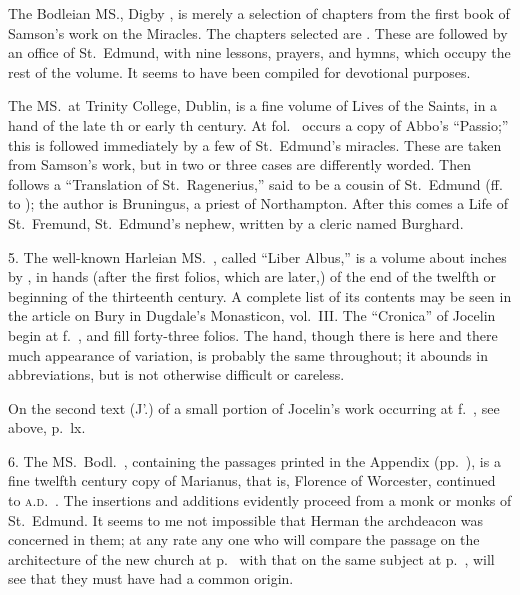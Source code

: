 \documentclass[10pt]{book}
\begin{document}
{The Bodleian MS., Digby , is merely a selection of chapters from the first book of Samson's work on the Miracles. The chapters selected are . These are followed by an office of St.\ Edmund, with nine lessons, prayers, and hymns, which occupy the rest of the volume. It seems to have been compiled for devotional purposes.

The MS.\ at Trinity College, Dublin, is a fine volume of Lives of the Saints, in a hand of the late th or early th century. At fol.\  occurs a copy of Abbo's ``Passio;'' this is followed immediately by a few of St.\ Edmund's miracles. These are taken from Samson's work, but in two or three cases are differently worded. Then follows a ``Translation of St.\ Ragenerius,'' said to be a cousin of St.\ Edmund (ff.\  to ); the author is Bruningus, a priest of Northampton. After this comes a Life of St.\ Fremund, St.\ Edmund's nephew, written by a cleric named Burghard.

5. The well-known Harleian MS.\ , called ``Liber Albus,'' is a volume about  inches by , in hands (after the first  folios, which are later,) of the end of the twelfth or beginning of the thirteenth century. A complete list of its contents may be seen in the article on Bury in Dugdale's Monasticon, vol.\ III. The ``Cronica'' of Jocelin begin at f.\ , and fill forty-three folios. The hand, though there is here and there much appearance of variation, is probably the same throughout; it abounds in abbreviations, but is not otherwise difficult or careless.

On the second text (J'.) of a small portion of Jocelin's work occurring at f.\ , see above, p.\ lx.

6. The MS.\ Bodl.\ , containing the passages printed in the Appendix (pp.\ ), is a fine twelfth century copy of Marianus, that is, Florence of Worcester, continued to \textsc{a.d}.\ . The insertions and additions evidently proceed from a monk or monks of St.\ Edmund. It seems to me not impossible that Herman the archdeacon was concerned in them; at any rate any one who will compare the passage on the architecture of the new church at p.\  with that on the same subject at p.\ , will see that they must have had a common origin.

}
\end{document}
